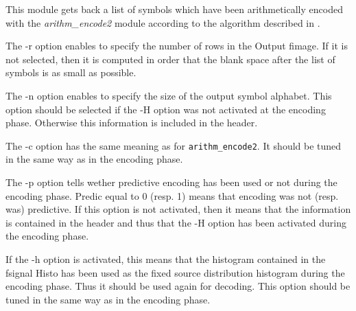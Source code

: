 This module gets back a list of symbols which have been arithmetically encoded 
with the {\em arithm\_encode2} module according to the algorithm 
described in \cite{witten.neal.ea:arithmetic}. 

The -r option enables to specify the number of rows in the Output fimage. 
If it is not selected, then it is computed in order that the 
blank space after the list of symbols is as small as possible. 

The -n option enables to specify the size of the output symbol alphabet. 
This option should be selected if the -H option was not activated 
at the encoding phase. Otherwise this information is included in the header. 

The -c option has the same meaning as for {\tt arithm\_encode2}. 
It should be tuned in the same way as in the encoding phase. 

The -p option tells wether predictive encoding has been used or not 
during the encoding phase. Predic equal to 0 (resp. 1) means that encoding 
was not (resp. was) predictive. If this option is not activated, 
then it means that the information is contained in the header and thus 
that the -H option has been activated during the encoding phase. 

If the -h option is activated, this means that the histogram contained 
in the fsignal Histo has been used as the fixed source distribution histogram 
during the encoding phase. Thus it should be used again for decoding.  
This option should be tuned in the same way as in the encoding phase. 
